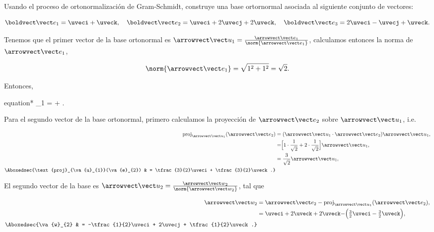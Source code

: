 \documentclass[../main.tex]{subfiles}
\begin{document}
\begin{problema}
	Usando el proceso de ortonormalización de Gram-Schmidt, construye una base
	ortornormal asociada al siguiente conjunto de vectores:

	\begin{equation*}
		\ev{1} = \uveci + \uveck,\quad
		\ev{2} = \uveci + 2\uvecj + 2\uveck,\quad
		\ev{3} = 2\uveci - \uvecj + \uveck.
	\end{equation*}

	\startsolution

	Tenemos que el primer vector de la base ortonormal es \(\va{u}_{1} = \tfrac{\va{e}_{1}}{\norm{\va{e}_{1}}}\), calculamos entonces la norma de \({\va{e}_{1}}\),

	\begin{equation*}
		\norm{{\va{e}_{1}}} = \sqrt{1^{2} + 1^{2}} = \sqrt{2}.
	\end{equation*}

	Entonces,

	\begin{empheq}[box=\mainresult]{equation*}
		_{1} = \uveci + \uveck.
	\end{empheq}

	Para el segundo vector de la base ortonormal,
	primero calculamos la proyección de \(\va{e}_{2}\)
	sobre \(\va{u}_{1}\), i.e.

	\begin{align*}
		\text{proj}_{\va{u}_{1}}(\va{e}_{2})            & = (\dotp{\va{u}_{1}}{\va{e}_{2}})\va{u}_{1},                                   \\
		                                                & = \Bigr[1\cdot\dfrac{1}{\sqrt{2}} + 2\cdot\dfrac{1}{\sqrt{2}}\Bigl]\va{u}_{1}, \\
		                                                & = \dfrac{3}{\sqrt{2}}\va{u}_{1},                                               \\
		\Aboxedsec{\text{proj}_{\va{u}_{1}}(\va{e}_{2}) & = \tfrac{3}{2}\uveci + \tfrac{3}{2}\uveck.}
	\end{align*}

	El segundo vector de la base es \(\va{u}_{2} = \tfrac{\va{w}_{2}}{\norm{\va{w}_{2}}}\), tal que

	\begin{align*}
		\va{w}_{2}            & = \va{e}_{2} - \text{proj}_{\va{u}_{1}}(\va{e}_{2}),                                \\
		                      & = \uveci + 2\uveck + 2\uveck - \Bigr(\tfrac{3}{2}\uveci - \tfrac{3}{2}\uveck\Bigl), \\
		\Aboxedsec{\va{w}_{2} & = -\tfrac{1}{2}\uveci + 2\uvecj + \tfrac{1}{2}\uveck.}
	\end{align*}


\end{problema}
\end{document}
